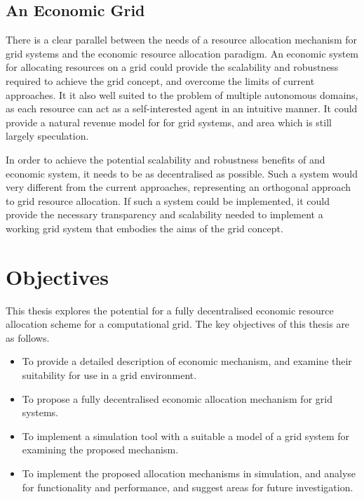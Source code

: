 \subsection{An Economic Grid}

There is a clear parallel between the needs of a resource allocation mechanism
for grid systems and the economic resource allocation paradigm. An economic
system for allocating resources on a grid could provide the scalability and
robustness required to achieve the grid concept, and overcome the limits of
current approaches.  It it also well suited to the problem of multiple
autonomous domains, as each resource can act as a self-interested agent in an
intuitive manner. It could provide a natural revenue model for for grid
systems, and area which is still largely speculation.

In order to achieve the potential scalability and robustness benefits of and
economic system, it needs to be as decentralised as possible. Such a system
would very different from the current approaches, representing an orthogonal
approach to grid resource allocation. If such a system could be implemented, it
could provide the necessary transparency and scalability needed to implement a
working grid system that embodies the aims of the grid concept.



\section{Objectives}

This thesis explores the potential for a fully decentralised economic resource
allocation scheme for a computational grid. The key objectives of this thesis
are as follows.

\begin{itemize}

  \item To provide a detailed description of economic mechanism, and examine
    their suitability for use in a grid environment.
    
  \item To propose a fully decentralised economic allocation mechanism for
    grid systems.

  \item To implement a simulation tool with a suitable a model of a grid system
    for examining the proposed mechanism.

  \item To implement the proposed allocation mechanisms in simulation, and
    analyse for functionality and performance, and suggest areas for future
    investigation.

\end{itemize}


